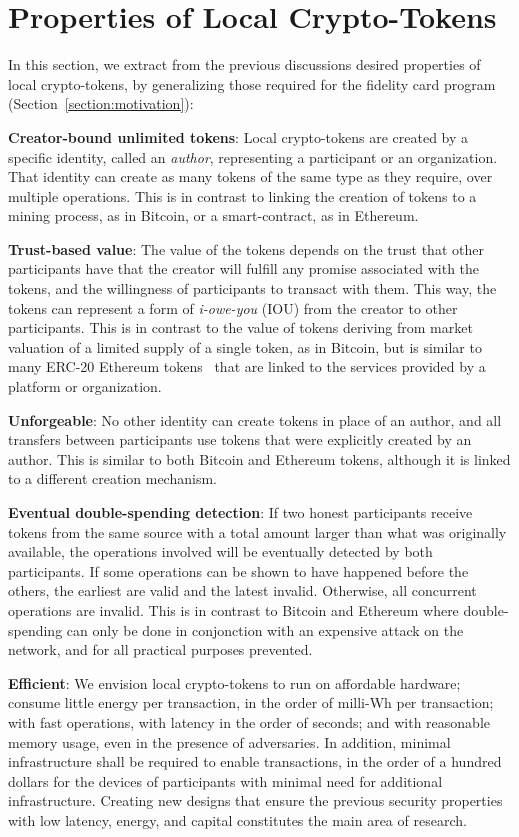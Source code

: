 \documentclass[sigplan,screen,10pt,review,anonymous]{acmart}
\begin{document}
\section{Properties of Local Crypto-Tokens}
\label{section:problem}

In this section, we extract from the previous discussions desired properties of local crypto-tokens, by generalizing those required for the fidelity card program (Section~\ref{section:motivation}):

\textbf{Creator-bound unlimited tokens}: Local crypto-tokens are created by a specific identity, called an \textit{author}, representing a participant or an organization. That identity can create as many tokens of the same type as they require, over multiple operations. This is in contrast to linking the creation of tokens to a mining process, as in Bitcoin, or a smart-contract, as in Ethereum.

\textbf{Trust-based value}:  The value of the tokens depends on the trust that other participants have that the creator will fulfill any promise associated with the tokens, and the willingness of participants to transact with them. This way, the tokens can represent a form of \textit{i-owe-you} (IOU) from the creator to other participants. This is in contrast to the value of tokens deriving from market valuation of a limited supply of a single token, as in Bitcoin, but is similar to many ERC-20 Ethereum tokens~\cite{erc20} that are linked to the services provided by a platform or organization.

\textbf{Unforgeable}: No other identity can create tokens in place of an author, and all transfers between participants use tokens that were explicitly created by an author. This is similar to both Bitcoin and Ethereum tokens, although it is linked to a different creation mechanism.

\textbf{Eventual double-spending detection}: If two honest participants receive tokens from the same source with a total amount larger than what was originally available, the operations involved will be eventually detected by both participants. If some operations can be shown to have happened before the others, the earliest are valid and the latest invalid. Otherwise, all concurrent operations are invalid. This is in contrast to Bitcoin and Ethereum where double-spending can only be done in conjonction with an expensive attack on the network, and for all practical purposes prevented. 

\textbf{Efficient}: We envision local crypto-tokens to run on affordable hardware; consume little energy per transaction, in the order of milli-Wh per transaction; with fast operations, with latency in the order of seconds; and with reasonable memory usage, even in the presence of adversaries. 
In addition, minimal infrastructure shall be required to enable transactions, in the order of a hundred dollars for the devices of participants with minimal need for additional infrastructure. Creating new designs that ensure the previous security properties with low latency, energy, and capital constitutes the main area of research.
\end{document}
